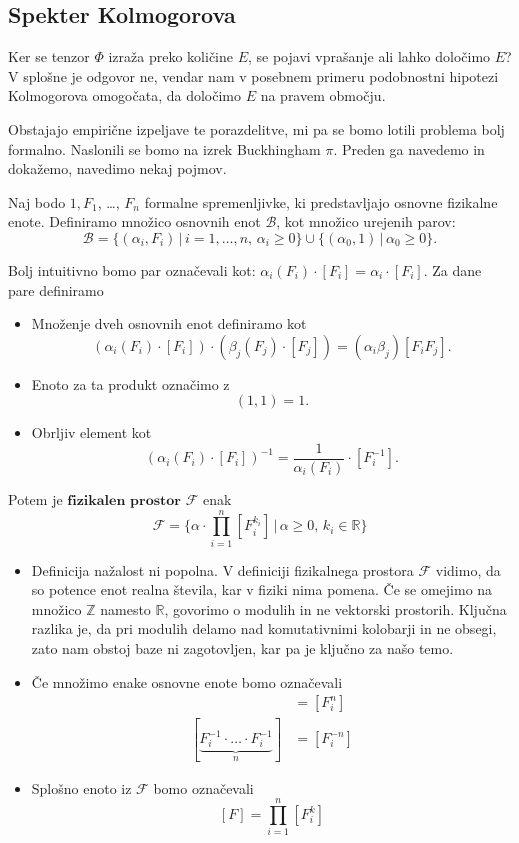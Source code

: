 \documentclass[mat2, tisk]{fmfdelo}
\newcommand{\R}{\mathbb R}
\newcommand{\Z}{\mathbb Z}
\newcommand{\bd}{\textbf}
\begin{document}
\subsection{Spekter Kolmogorova}

Ker se tenzor $\Phi$ izraža preko količine $E$, se pojavi vprašanje 
ali lahko določimo $E$? V splošne je odgovor ne, vendar nam v posebnem 
primeru podobnostni hipotezi Kolmogorova omogočata, da določimo
$E$ na pravem območju.

Obstajajo empirične izpeljave te porazdelitve, mi pa se bomo lotili 
problema bolj formalno. Naslonili se bomo na izrek Buckhingham $\pi$.
Preden ga navedemo in dokažemo, navedimo nekaj pojmov. 

\begin{definicija}
Naj bodo $1, F_1$, \dots, $F_n$ formalne spremenljivke, ki predstavljajo 
osnovne fizikalne enote. Definiramo množico osnovnih enot $\mathcal{B}$, kot 
množico urejenih parov: 
$$
\mathcal{B} = \{(\alpha_i, F_i) \,|\, i= 1, \dots, n, \, \alpha_i \geq 0\} \cup \{(\alpha_0, 1) \,|\, \alpha_0 \geq 0\}.
$$

Bolj intuitivno bomo par označevali kot: $\alpha_i(F_i)\cdot [F_i] = \alpha_i \cdot [F_i]$. 
Za dane pare definiramo 
\begin{itemize}
  \item Množenje dveh osnovnih enot definiramo kot  
  $$
  (\alpha_i(F_i)\cdot [F_i]) \cdot (\beta_j(F_j)\cdot [F_j]) = (\alpha_i \beta_j)[F_i F_j].
  $$
  \item Enoto za ta produkt označimo z 
  $$
  (1, 1) = 1.
  $$
  \item Obrljiv element kot 
  $$
  (\alpha_i(F_i)\cdot [F_i])^{-1} = \frac{1}{\alpha_i{(F_i)}} \cdot [F_i^{-1}].
  $$

\end{itemize}

Potem je $\bd{fizikalen prostor}$ $\mathcal{F}$ enak 
$$
\mathcal{F} = \{\alpha \cdot \prod_{i=1}^n [F_i^{k_i}] \,|\, \alpha \geq 0,\, k_i\in \R\}
$$
\end{definicija}

\begin{opomba}
\hfill
\begin{itemize}
 \item Definicija nažalost ni popolna. V definiciji fizikalnega prostora $\mathcal{F}$
 vidimo, da so potence enot realna števila, kar v fiziki nima pomena. 
 Če se omejimo na množico $\Z$ namesto $\R$, govorimo 
 o modulih in ne vektorski prostorih. Ključna razlika je, da pri modulih delamo nad 
 komutativnimi kolobarji in ne obsegi, zato nam obstoj baze ni zagotovljen, kar pa 
 je ključno za našo temo.
 \item Če množimo enake osnovne enote bomo označevali
  \begin{align*}
    [\underbrace{F_i \cdot \ldots \cdot F_i}_n] &= [F^n_i] \\
    [\underbrace{F_i^{-1} \cdot \dots \cdot F_i^{-1}}_n] &= [F^{-n}_{i}]
  \end{align*}
\item Splošno enoto iz $\mathcal{F}$ bomo označevali 
$$
[F] = \prod_{i=1}^n [F_i^{k}]
$$
\end{itemize}
\end{opomba}
\end{document}
